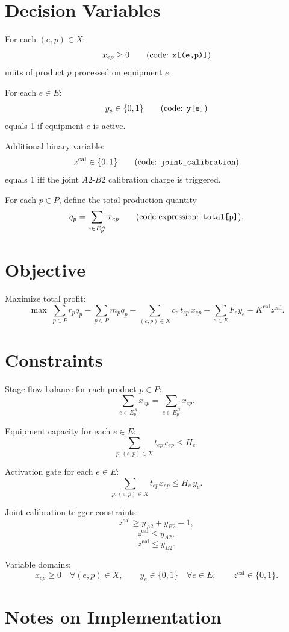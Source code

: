\section*{Decision Variables}

For each \((e,p)\in X\):
\[
x_{ep}\ge 0
\qquad\text{(code: \texttt{x[(e,p)]})}
\]
units of product \(p\) processed on equipment \(e\).

For each \(e\in E\):
\[
y_e\in\{0,1\}
\qquad\text{(code: \texttt{y[e]})}
\]
equals 1 if equipment \(e\) is active.

Additional binary variable:
\[
z^{\mathrm{cal}}\in\{0,1\}
\qquad\text{(code: \texttt{joint\_calibration})}
\]
equals 1 iff the joint \(A2\)-\(B2\) calibration charge is triggered.

For each \(p\in P\), define the total production quantity
\[
q_p=\sum_{e\in E^A_p} x_{ep}
\qquad\text{(code expression: \texttt{total[p]})}.
\]

\section*{Objective}

Maximize total profit:
\[
\max \;
\sum_{p\in P} r_p q_p
-\sum_{p\in P} m_p q_p
-\sum_{(e,p)\in X} c_e\, t_{ep}\, x_{ep}
-\sum_{e\in E} F_e y_e
-K^{\mathrm{cal}} z^{\mathrm{cal}}.
\]

\section*{Constraints}

Stage flow balance for each product \(p\in P\):
\[
\sum_{e\in E^A_p} x_{ep}
=
\sum_{e\in E^B_p} x_{ep}.
\]

Equipment capacity for each \(e\in E\):
\[
\sum_{p:(e,p)\in X} t_{ep} x_{ep} \le H_e.
\]

Activation gate for each \(e\in E\):
\[
\sum_{p:(e,p)\in X} t_{ep} x_{ep} \le H_e\, y_e.
\]

Joint calibration trigger constraints:
\[
z^{\mathrm{cal}} \ge y_{A2}+y_{B2}-1,
\]
\[
z^{\mathrm{cal}} \le y_{A2},
\]
\[
z^{\mathrm{cal}} \le y_{B2}.
\]

Variable domains:
\[
x_{ep}\ge 0 \quad \forall (e,p)\in X,
\qquad
y_e\in\{0,1\}\quad \forall e\in E,
\qquad
z^{\mathrm{cal}}\in\{0,1\}.
\]

\section*{Notes on Implementation}


